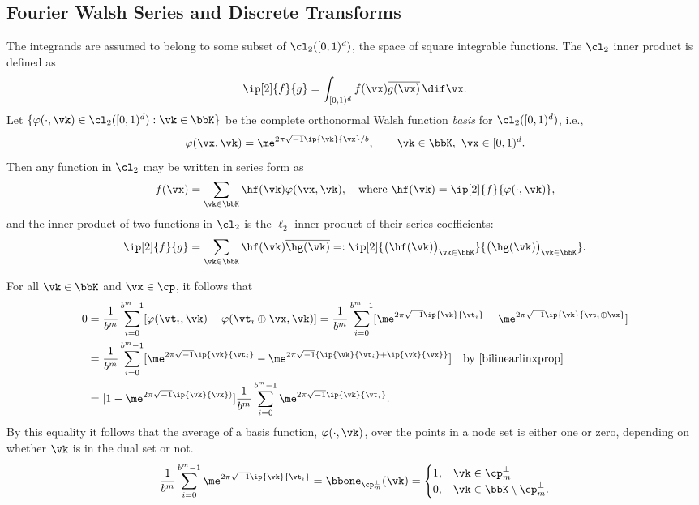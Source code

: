 \documentclass[]{elsarticle}
\theoremstyle{definition}
\newcommand{\cube}{[0,1)^d}
\begin{document}
\subsection{Fourier Walsh Series and Discrete Transforms}

The integrands are assumed to belong to some subset of $\cl_2(\cube)$, the space of square integrable functions.  The $\cl_2$ inner product is defined as
\[
\ip[2]{f}{g} = \int_{\cube} f(\vx) \overline{g(\vx)} \, \dif \vx.
\]
Let $\{\varphi(\cdot,\vk) \in \cl_2(\cube) : \vk \in \bbK\}$ be the complete orthonormal Walsh function \emph{basis} for $\cl_2(\cube)$, i.e.,
\[
\varphi(\vx,\vk)  = \me^{2 \pi \sqrt{-1} \ip{\vk}{\vx}/b}, \qquad \vk \in \bbK, \ \vx \in \cube.
\]
Then any function in $\cl_2$ may be written in series form as
\begin{equation} \label{Fourierdef}
f(\vx) = \sum_{\vk \in \bbK} \hf(\vk) \varphi(\vx,\vk), \quad \text{where } \hf(\vk) = \ip[2]{f}{\varphi(\cdot,\vk)},
\end{equation}
and the inner product of two functions in $\cl_2$ is the $\ell_2$ inner product of their series coefficients:
\[
\ip[2]{f}{g} = \sum_{\vk \in \bbK} \hf(\vk)\overline{\hg(\vk)} =: \ip[2]{\bigl(\hf(\vk)\bigr)_{\vk \in \bbK}}{\bigl ( \hg(\vk)\bigr )_{\vk \in \bbK}}.
\]

For all $\vk \in \bbK$ and $\vx \in \cp$, it follows that
\begin{align*}
\nonumber
0 & = \frac{1}{b^m} \sum_{i=0}^{b^m-1} [\varphi(\vt_i,\vk) - \varphi(\vt_i \oplus \vx,\vk)]
= \frac{1}{b^m} \sum_{i=0}^{b^m-1} [\me^{2 \pi \sqrt{-1} \ip{\vk}{\vt_i}} - \me^{2 \pi \sqrt{-1} \ip{\vk}{\vt_i \oplus \vx}}]\\
\nonumber
& = \frac{1}{b^m} \sum_{i=0}^{b^m-1} [\me^{2 \pi \sqrt{-1} \ip{\vk}{\vt_i}} - \me^{2 \pi \sqrt{-1} \{\ip{\vk}{\vt_i}+\ip{\vk}{\vx}\}}] \quad \text{by } \eqref{bilinearlinxprop}\\
\label{sumeq}
& = [1 - \me^{2 \pi \sqrt{-1} \ip{\vk}{\vx})}] \frac{1}{b^m} \sum_{i=0}^{b^m-1}  \me^{2 \pi \sqrt{-1} \ip{\vk}{\vt_i}}.
\end{align*}
By this equality it follows that the average of a basis function, $\varphi(\cdot,\vk)$, over the points in a node set is either one or zero, depending on whether $\vk$ is in the dual set or not.
\begin{equation*}
\frac{1}{b^m} \sum_{i=0}^{b^m-1}  \me^{2 \pi \sqrt{-1} \ip{\vk}{\vt_i}} = \bbone_{\cp_m^{\perp}}(\vk) = \begin{cases} 1 , & \vk \in \cp_m^{\perp}\\
 0,  & \vk \in \bbK \setminus \cp_m^{\perp}.
 \end{cases}
\end{equation*}
\end{document}
